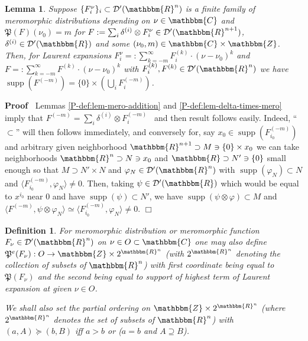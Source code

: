 \documentclass{article}
\newcommand{\assign}{:=}
\newcommand{\nobracket}{}
\newcommand{\tmop}[1]{\ensuremath{\operatorname{#1}}}
\newenvironment{proof}{\noindent\textbf{Proof\ }}{\hspace*{\fill}$\Box$\medskip}
\newtheorem{definition}{Definition}
\numberwithin{definition}{section}
\newtheorem{lemma}{Lemma}
\numberwithin{lemma}{section}
\numberwithin{proposition}{section}
{\theorembodyfont{\rmfamily}\newtheorem{remark}{Remark}
\numberwithin{remark}{section}
}
\begin{document}
\begin{lemma}
  \label{P-def:lem-mero-supp}Suppose $\{ F_i^{\nu} \}_i \subset \mathcal{D}' (
  \mathbbm{R}^n)$ is a finite family of meromorphic distributions depending on
  $\nu \in \mathbbm{C}$ and $\mathfrak{P} ( F) ( \nu_0) = m$ for $F \assign
  \sum_i \delta^{( i)} \otimes F_i^{\nu} \in \mathcal{D}' ( \mathbbm{R}^{n +
  1})$, $\delta^{( i)} \in \mathcal{D}' ( \mathbbm{R})$ and some $( \nu_0, m)
  \in \mathbbm{C} \nobracket \times \mathbbm{Z} \nobracket$. Then, for Laurent
  expansions $F_i^{\nu} = : \sum_{k = - m}^{\infty} F_i^{( k)} \cdot ( \nu -
  \nu_0)^k$ and $F = : \sum_{k = - m}^{\infty} F^{( k)} \cdot ( \nu -
  \nu_0)^k$ with $F_i^{( k)}, F^{( k)} \in \mathcal{D}' ( \mathbbm{R}^n)$ we
  have $\tmop{supp} ( F_{}^{( - m)}) = \{ 0 \} \times \left( \bigcup_i F_i^{(
  - m)} \right)^{}$.
\end{lemma}

\begin{proof}
  Lemmas \ref{P-def:lem-mero-addition} and \ref{P-def:lem-delta-times-mero}
  imply that $F^{( - m)} = \sum_i \delta^{( i)} \otimes F_i^{( - m)}$ \ and
  then result follows easily. Indeed, ``$\subset$'' will then follows
  immediately, and conversely for, say $x_0 \in \tmop{supp} ( F_{i_0}^{( -
  m)})$ and arbitrary given neighborhood $\mathbbm{R}^{n + 1} \supset M \ni \{
  0 \} \times x_0$ we can take neighborhoods $\mathbbm{R}^n \supset N \ni x_0$
  and $\mathbbm{R} \supset N' \ni \{ 0 \}$ small enough so that $M \supset N'
  \times N$ and $\varphi_N \in \mathcal{D}' ( \mathbbm{R}^n)$ with
  $\tmop{supp} ( \varphi_N) \subset N$ and $\langle F_{i_0}^{( - m)},
  \varphi_N \rangle \neq 0$. Then, taking $\psi \in \mathcal{D}' (
  \mathbbm{R})$ which would be equal to $x^{i_0}$ near 0 and have $\tmop{supp}
  ( \psi) \subset N'$, we have $\tmop{supp} ( \psi \otimes \varphi) \subset M$
  and $\langle F^{( - m)}, \psi \otimes \varphi_N \rangle \simeq \langle
  F_{i_0}^{( - m)}, \varphi_N \rangle \neq 0$.
\end{proof}

\begin{definition}
  \label{P-def:def-9}For meromorphic distribution or meromorphic function
  $F_{\nu} \in \mathcal{D}' ( \mathbbm{R}^n)$ on $\nu \in O \subset
  \mathbbm{C}$ one may also define $\mathfrak{P}^e ( F_{\nu}) : O \rightarrow
  \mathbbm{Z} \times 2^{\mathbbm{R}^n}$ (with $2^{\mathbbm{R}^n}$ denoting the
  collection of subsets of $\mathbbm{R}^n$) with first coordinate being equal
  to $\mathfrak{P} ( F_{\nu})$ and the second being equal to support of
  highest term of Laurent expansion at given $\nu \in O$.
  
  We shall also set the partial ordering on $\mathbbm{Z} \times
  2^{\mathbbm{R}^n}$ (where $2^{\mathbbm{R}^n}$ denotes the set of subsets of
  $\mathbbm{R}^n$) with $( a, A) \succcurlyeq ( b, B)$ iff $a > b$ or ($a = b$
  and $A \supseteq B$).
\end{definition}
\end{document}
